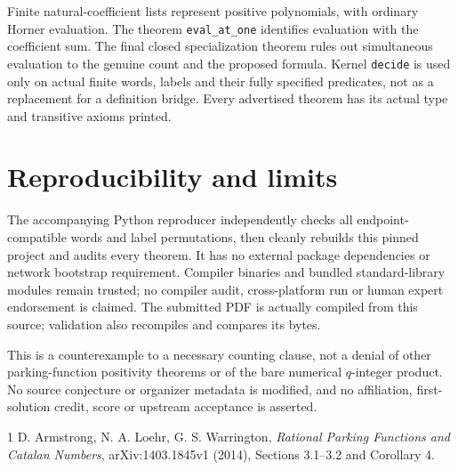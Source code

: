 \documentclass[10pt,a4paper]{article}
\begin{document}
Finite natural-coefficient lists represent positive polynomials, with ordinary
Horner evaluation. The theorem \texttt{eval\_at\_one} identifies evaluation
with the coefficient sum. The final closed specialization theorem rules out
simultaneous evaluation to the genuine count and the proposed formula.
Kernel \texttt{decide} is used only on actual finite words, labels and their
fully specified predicates, not as a replacement for a definition bridge.
Every advertised theorem has its actual type and transitive axioms printed.

\section{Reproducibility and limits}
The accompanying Python reproducer independently checks all endpoint-compatible
words and label permutations, then cleanly rebuilds this pinned project and
audits every theorem. It has no external package dependencies or network
bootstrap requirement. Compiler binaries and bundled standard-library modules
remain trusted; no compiler audit, cross-platform run or human expert endorsement
is claimed. The submitted PDF is actually compiled from this source; validation
also recompiles and compares its bytes.

This is a counterexample to a necessary counting clause, not a denial of other
parking-function positivity theorems or of the bare numerical $q$-integer
product. No source conjecture or organizer metadata is modified, and no
affiliation, first-solution credit, score or upstream acceptance is asserted.

\begin{thebibliography}{1}
 D. Armstrong, N. A. Loehr, G. S. Warrington,
\emph{Rational Parking Functions and Catalan Numbers},
arXiv:1403.1845v1 (2014), Sections 3.1--3.2 and Corollary 4.
\end{thebibliography}
\end{document}
